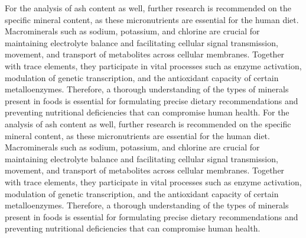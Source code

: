 For the analysis of ash content as well, further research is recommended on the specific mineral content, as these micronutrients are essential for the human diet. Macrominerals such as sodium, potassium, and chlorine are crucial for maintaining electrolyte balance and facilitating cellular signal transmission, movement, and transport of metabolites across cellular membranes. Together with trace elements, they participate in vital processes such as enzyme activation, modulation of genetic transcription, and the antioxidant capacity of certain metalloenzymes. Therefore, a thorough understanding of the types of minerals present in foods is essential for formulating precise dietary recommendations and preventing nutritional deficiencies that can compromise human health. For the analysis of ash content as well, further research is recommended on the specific mineral content, as these micronutrients are essential for the human diet. Macrominerals such as sodium, potassium, and chlorine are crucial for maintaining electrolyte balance and facilitating cellular signal transmission, movement, and transport of metabolites across cellular membranes. Together with trace elements, they participate in vital processes such as enzyme activation, modulation of genetic transcription, and the antioxidant capacity of certain metalloenzymes.
Therefore, a thorough understanding of the types of minerals present in foods is essential for formulating precise dietary recommendations and preventing nutritional deficiencies that can compromise human health.

